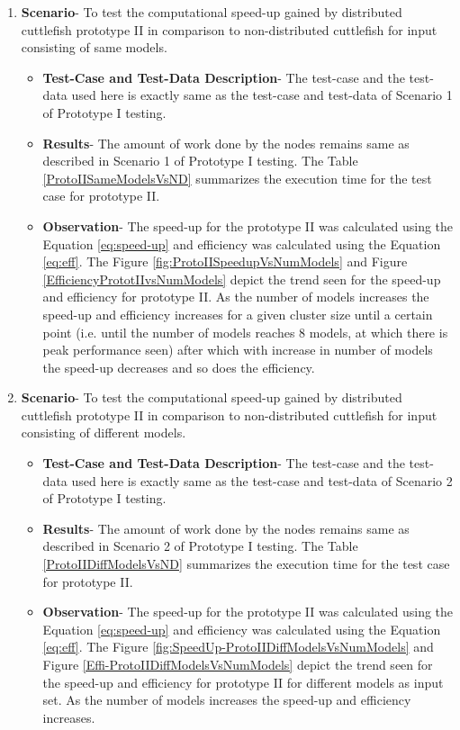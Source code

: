 \begin{enumerate}
\item{\textbf{Scenario}}- To test the computational speed-up gained by distributed cuttlefish prototype II in comparison to non-distributed cuttlefish for input consisting of same models.
\begin{itemize}
\item{\textbf{Test-Case and Test-Data Description}}- The test-case and the test-data used here is exactly same as the test-case and test-data of Scenario 1 of Prototype I testing.
\item{\textbf{Results}}- The amount of work done by the nodes remains same as described in Scenario 1 of Prototype I testing. The Table \ref{ProtoIISameModelsVsND} summarizes the execution time for the test case for prototype II.
\item{\textbf{Observation}}- The speed-up for the prototype II was calculated using the Equation \ref{eq:speed-up} and efficiency was calculated using the Equation \ref{eq:eff}. The Figure \ref{fig:ProtoIISpeedupVsNumModels} and Figure \ref{EfficiencyPrototIIvsNumModels} depict the trend seen for the speed-up and efficiency for prototype II. As the number of models increases the speed-up and efficiency increases for a given cluster size until a certain point (i.e. until the number of models reaches 8 models, at which there is peak performance seen) after which with increase in number of models the speed-up decreases and so does the efficiency.  
\end{itemize}

\item{\textbf{Scenario}}- To test the computational speed-up gained by distributed cuttlefish prototype II in comparison to non-distributed cuttlefish for input consisting of different models.
\begin{itemize}
\item{\textbf{Test-Case and Test-Data Description}}- The test-case and the test-data used here is exactly same as the test-case and test-data of Scenario 2 of Prototype I testing.
\item{\textbf{Results}}- The amount of work done by the nodes remains same as described in Scenario 2 of Prototype I testing. The Table \ref{ProtoIIDiffModelsVsND} summarizes the execution time for the test case for prototype II.
\item{\textbf{Observation}}-  The speed-up for the prototype II was calculated using the Equation \ref{eq:speed-up} and efficiency was calculated using the Equation \ref{eq:eff}. The Figure \ref{fig:SpeedUp-ProtoIIDiffModelsVsNumModels} and Figure \ref{Effi-ProtoIIDiffModelsVsNumModels} depict the trend seen for the speed-up and efficiency for prototype II for different models as input set. As the number of models increases the speed-up and efficiency increases.
\end{itemize}
\end{enumerate}



